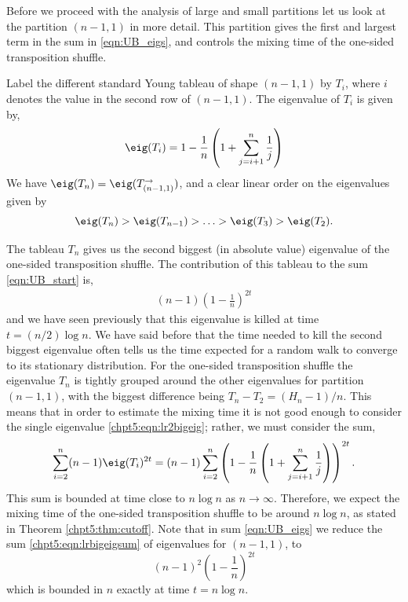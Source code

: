 \documentclass[11pt]{report}
\begin{document}
Before we proceed with the analysis of large and small partitions let us look at the partition $(n-1,1)$ in more detail. This partition gives the first and largest term in the sum in	\eqref{eqn:UB_eigs}, and controls the mixing time of the one-sided transposition shuffle.


Label the different standard Young tableau of shape $(n-1,1)$ by $T_{i}$, where $i$ denotes the value in the second row of $(n-1,1)$.
The eigenvalue of $T_{i}$ is given by,
\[\eig(T_{i}) = 1 -\frac{1}{n}\left(1 + \sum_{j=i+1}^{n} \frac{1}{j}\right)\]
We have $\eig(T_{n}) = \eig(T_{(n-1,1)}^{\rightarrow})$, and a clear linear order on the eigenvalues given by 
\[\eig(T_{n}) > \eig(T_{n-1}) > \ldots > \eig(T_{3}) > \eig(T_{2}) .\]

The tableau $T_{n}$ gives us the second biggest (in absolute value) eigenvalue of the one-sided transposition shuffle. The contribution of this tableau to the sum \eqref{eqn:UB_start} is,
\begin{eqnarray}
(n-1) \left(1 - \frac{1}{n}\right)^{2t} \label{chpt5:eqn:lr2bigeig}
\end{eqnarray}
and we have seen previously that this eigenvalue is killed at time $t =(n/2)\log n$. We have said before that the time needed to kill the second biggest eigenvalue often tells us the time expected for a random walk to converge to its stationary distribution. For the one-sided transposition shuffle the eigenvalue $T_{n}$ is tightly grouped around the other eigenvalues for partition $(n-1,1)$, with the biggest difference being $T_{n} -T_{2} =(H_{n}-1)/n$. This means that in order to estimate the mixing time it is not good enough to consider the single eigenvalue \eqref{chpt5:eqn:lr2bigeig}; rather, we must consider the sum,
\begin{eqnarray}
\sum_{i=2}^{n} (n-1) \eig(T_{i})^{2t} = (n-1) \sum_{i=2}^{n} \left(1 -\frac{1}{n}\left(1 + \sum_{j=i+1}^{n} \frac{1}{j} \right)\right)^{2t}. \label{chpt5:eqn:lrbigeigsum}
\end{eqnarray}
This sum is bounded at time close to $n\log n$ as $n\to \infty$. Therefore, we expect the mixing time of the one-sided transposition shuffle to be around $n\log n$, as stated in Theorem \ref{chpt5:thm:cutoff}. Note that in sum \eqref{eqn:UB_eigs} we reduce the sum \eqref{chpt5:eqn:lrbigeigsum} of eigenvalues for $(n-1,1)$, to
\[(n-1)^{2} \left(1 - \frac{1}{n}\right)^{2t} \]
which is bounded in $n$ exactly at time $t=n\log n$. 
\end{document}
